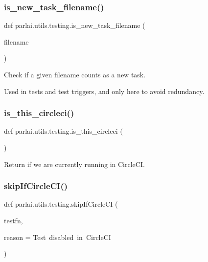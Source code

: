 \subsubsection{\texorpdfstring{is\+\_\+new\+\_\+task\+\_\+filename()}{is\_new\_task\_filename()}}
{\footnotesize\ttfamily def parlai.\+utils.\+testing.\+is\+\_\+new\+\_\+task\+\_\+filename (\begin{DoxyParamCaption}\item[{}]{filename }\end{DoxyParamCaption})}

\begin{DoxyVerb}Check if a given filename counts as a new task.

Used in tests and test triggers, and only here to avoid redundancy.
\end{DoxyVerb}
 \mbox{\label{namespaceparlai_1_1utils_1_1testing_a2b1aba8cb2afc498691840f4b8999420}} 
\subsubsection{\texorpdfstring{is\+\_\+this\+\_\+circleci()}{is\_this\_circleci()}}
{\footnotesize\ttfamily def parlai.\+utils.\+testing.\+is\+\_\+this\+\_\+circleci (\begin{DoxyParamCaption}{ }\end{DoxyParamCaption})}

\begin{DoxyVerb}Return if we are currently running in CircleCI.
\end{DoxyVerb}
 \mbox{\label{namespaceparlai_1_1utils_1_1testing_a056ab7a9ad687500924a29001a7d9264}} 
\subsubsection{\texorpdfstring{skip\+If\+Circle\+C\+I()}{skipIfCircleCI()}}
{\footnotesize\ttfamily def parlai.\+utils.\+testing.\+skip\+If\+Circle\+CI (\begin{DoxyParamCaption}\item[{}]{testfn,  }\item[{}]{reason = {\ttfamily \textquotesingle{}Test~disabled~in~CircleCI\textquotesingle{}} }\end{DoxyParamCaption})}


